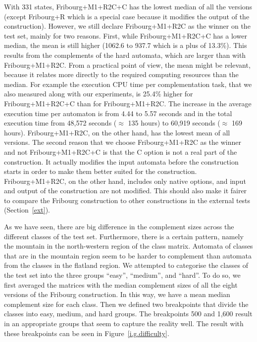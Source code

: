 With 331 states, Fribourg+M1+R2C+C has the lowest median of all the versions (except Fribourg+R which is a special case because it modifies the output of the construction). However, we still declare Fribourg+M1+R2C as the winner on the \goal{} test set, mainly for two reasons. First, while Fribourg+M1+R2C+C has a lower median, the mean is still higher (1062.6 to 937.7 which is a plus of 13.3\%). This results from the complements of the hard automata, which are larger than with Fribourg+M1+R2C. From a practical point of view, the mean might be relevant, because it relates more directly to the required computing resources than the median. For example the execution CPU time per complementation task, that we also measured along with our experiments, is 25.4\% higher for Fribourg+M1+R2C+C than for Fribourg+M1+R2C. The increase in the average execution time per automaton is from 4.44 to 5.57 seconds and in the total execution time from 48,572 seconds ($\approx$ 135 hours) to 60,919 seconds ($\approx$ 169 hours). Fribourg+M1+R2C, on the other hand, has the lowest mean of all versions. The second reason that we choose Fribourg+M1+R2C as the winner and not Fribourg+M1+R2C+C is that the C option is not a real part of the construction. It actually modifies the input automata before the construction starts in order to make them better suited for the construction. Fribourg+M1+R2C, on the other hand, includes only native options, and input and output of the construction are not modified. This should also make it fairer to compare the Fribourg construction to other constructions in the external tests (Section~\ref{ext}).

As we have seen, there are big difference in the complement sizes across the different classes of the \goal{} test set. Furthermore, there is a certain pattern, namely the mountain in the north-western region of the class matrix. Automata of classes that are in the mountain region seem to be harder to complement than automata from the classes in the flatland region. We attempted to categorise the classes of the \goal{} test set into the three groups ``easy'', ``medium'', and ``hard''. To do so, we first averaged the matrices with the median complement sizes of all the eight versions of the Fribourg construction. In this way, we have a mean median complement size for each class. Then we defined two breakpoints that divide the classes into easy, medium, and hard groups. The breakpoints 500 and 1,600 result in an appropriate groups that seem to capture the reality well. The result with these breakpoints can be seen in Figure~\ref{i.g.difficulty}.

